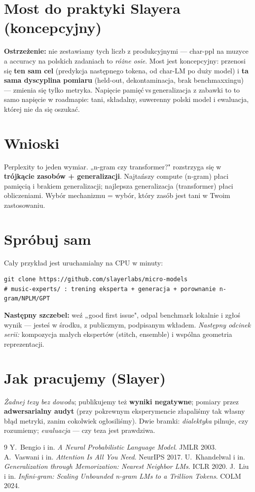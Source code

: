 \documentclass[11pt,a4paper]{article}
\begin{document}
\section{Most do praktyki Slayera (koncepcyjny)}
\textbf{Ostrzeżenie:} nie zestawiamy tych liczb z produkcyjnymi --- char-ppl na muzyce a accuracy na polskich zadaniach to \emph{różne osie}. Most jest koncepcyjny: przenosi się \textbf{ten sam cel} (predykcja następnego tokena, od char-LM po duży model) i \textbf{ta sama dyscyplina pomiaru} (held-out, dekontaminacja, brak benchmaxxingu) --- zmienia się tylko metryka. Napięcie pamięć\,vs\,generalizacja z zabawki to to samo napięcie w roadmapie: tani, składalny, suwerenny polski model i ewaluacja, której nie da się oszukać.

\section{Wnioski}
Perplexity to jeden wymiar. „n-gram czy transformer?" rozstrzyga się w \textbf{trójkącie zasobów + generalizacji}. Najtańszy compute (n-gram) płaci pamięcią i brakiem generalizacji; najlepsza generalizacja (transformer) płaci obliczeniami. Wybór mechanizmu = wybór, który zasób jest tani w Twoim zastosowaniu.

\section{Spróbuj sam}
Cały przykład jest uruchamialny na CPU w minuty:
\begin{verbatim}
git clone https://github.com/slayerlabs/micro-models
# music-experts/ : trening eksperta + generacja + porownanie n-gram/NPLM/GPT
\end{verbatim}
\textbf{Następny szczebel:} weź „good first issue", odpal benchmark lokalnie i zgłoś wynik --- jesteś w środku, z publicznym, podpisanym wkładem. \emph{Następny odcinek serii:} kompozycja małych ekspertów (stitch, ensemble) i wspólna geometria reprezentacji.

\section{Jak pracujemy (Slayer)}
\emph{Żadnej tezy bez dowodu}; publikujemy też \textbf{wyniki negatywne}; pomiary przez \textbf{adwersarialny audyt} (przy pokrewnym eksperymencie złapaliśmy tak własny błąd metryki, zanim cokolwiek ogłosiliśmy). Dwie bramki: \emph{dialektyka} pilnuje, czy rozumiemy; \emph{ewaluacja} --- czy teza jest prawdziwa.

\begin{thebibliography}{9}
 Y.~Bengio i in. \emph{A Neural Probabilistic Language Model}. JMLR 2003.
 A.~Vaswani i in. \emph{Attention Is All You Need}. NeurIPS 2017.
 U.~Khandelwal i in. \emph{Generalization through Memorization: Nearest Neighbor LMs}. ICLR 2020.
 J.~Liu i in. \emph{Infini-gram: Scaling Unbounded n-gram LMs to a Trillion Tokens}. COLM 2024.
\end{thebibliography}
\end{document}
